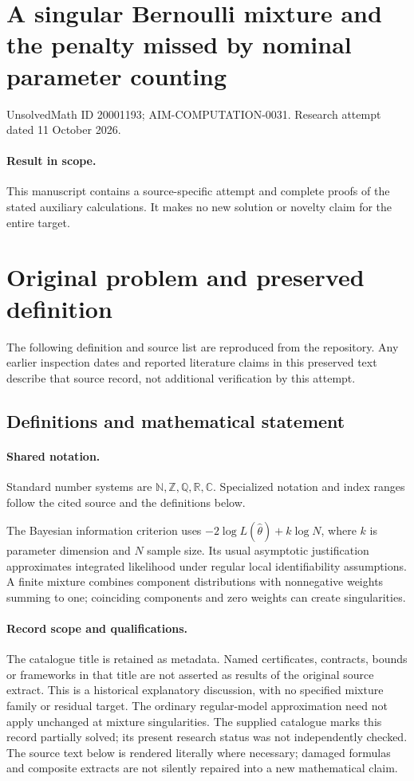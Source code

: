 \documentclass[11pt]{article}
\begin{document}
\section*{A singular Bernoulli mixture and the penalty missed by nominal parameter counting}
\noindent UnsolvedMath ID 20001193; AIM-COMPUTATION-0031. Research attempt dated 11 October 2026.
\paragraph{Result in scope.}This manuscript contains a source-specific attempt and complete proofs of the stated auxiliary calculations. It makes no new solution or novelty claim for the entire target.
\section{Original problem and preserved definition}
The following definition and source list are reproduced from the repository. Any earlier inspection dates and reported literature claims in this preserved text describe that source record, not additional verification by this attempt.
\subsection{Definitions and mathematical statement}

\paragraph{Shared notation.}Standard number systems are $\mathbb N,\mathbb Z,\mathbb Q,\mathbb R,\mathbb C$. Specialized notation and index ranges follow the cited source and the definitions below.


The Bayesian information criterion uses $-2\log L(\widehat\theta)+k\log N$, where $k$ is parameter dimension and $N$ sample size. Its usual asymptotic justification approximates integrated likelihood under regular local identifiability assumptions. A finite mixture combines component distributions with nonnegative weights summing to one; coinciding components and zero weights can create singularities.
\paragraph{Record scope and qualifications.}
The catalogue title is retained as metadata. Named certificates, contracts, bounds or frameworks in that title are not asserted as results of the original source extract.
This is a historical explanatory discussion, with no specified mixture family or residual target. The ordinary regular-model approximation need not apply unchanged at mixture singularities. The supplied catalogue marks this record partially solved; its present research status was not independently checked.
The source text below is rendered literally where necessary; damaged formulas and composite extracts are not silently repaired into a new mathematical claim.
\end{document}
